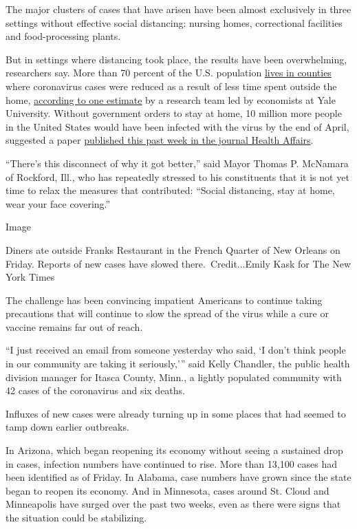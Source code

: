 The major clusters of cases that have arisen have been almost
exclusively in three settings without effective social distancing:
nursing homes, correctional facilities and food-processing plants.

But in settings where distancing took place, the results have been
overwhelming, researchers say. More than 70 percent of the U.S.
population \href{https://jbayham.github.io/maps/distancing/}{lives in
counties} where coronavirus cases were reduced as a result of less time
spent outside the home,
\href{https://www.medrxiv.org/content/10.1101/2020.04.20.20073098v1}{according
to one estimate} by a research team led by economists at Yale
University. Without government orders to stay at home, 10 million more
people in the United States would have been infected with the virus by
the end of April, suggested a paper
\href{https://www.healthaffairs.org/doi/full/10.1377/hlthaff.2020.00608}{published
this past week in the journal Health Affairs}.

``There's this disconnect of why it got better,'' said Mayor Thomas P.
McNamara of Rockford, Ill., who has repeatedly stressed to his
constituents that it is not yet time to relax the measures that
contributed: ``Social distancing, stay at home, wear your face
covering.''

Image

Diners ate outside Franks Restaurant in the French Quarter of New
Orleans on Friday. Reports of new cases have slowed
there.~Credit...Emily Kask for The New York Times

The challenge has been convincing impatient Americans to continue taking
precautions that will continue to slow the spread of the virus while a
cure or vaccine remains far out of reach.

``I just received an email from someone yesterday who said, `I don't
think people in our community are taking it seriously,''' said Kelly
Chandler, the public health division manager for Itasca County, Minn., a
lightly populated community with 42 cases of the coronavirus and six
deaths.

Influxes of new cases were already turning up in some places that had
seemed to tamp down earlier outbreaks.

In Arizona, which began reopening its economy without seeing a sustained
drop in cases, infection numbers have continued to rise. More than
13,100 cases had been identified as of Friday. In Alabama, case numbers
have grown since the state began to reopen its economy. And in
Minnesota, cases around St. Cloud and Minneapolis have surged over the
past two weeks, even as there were signs that the situation could be
stabilizing.

